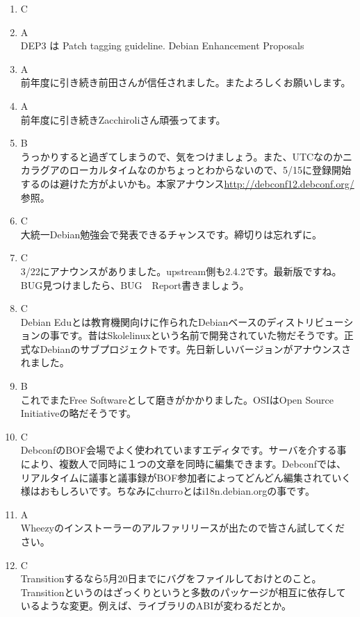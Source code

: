 \documentclass[mingoth,a4paper]{jsarticle}
\begin{document}
\begin{multicols}{2}
\begin{enumerate}
\item C\\
\item A\\ DEP3 は Patch tagging guideline. Debian Enhancement Proposals
\item A\\ 前年度に引き続き前田さんが信任されました。またよろしくお願いします。
\item A\\ 前年度に引き続きZacchiroliさん頑張ってます。
\item B\\ うっかりすると過ぎてしまうので、気をつけましょう。また、UTCなのかニカラグアのローカルタイムなのかちょっとわからないので、5/15に登録開始するのは避けた方がよいかも。本家アナウンス\url {http://debconf12.debconf.org/}参照。
\item  C\\ 大統一Debian勉強会で発表できるチャンスです。締切りは忘れずに。
\item  C\\ 3/22にアナウンスがありました。upstream側も2.4.2です。最新版ですね。BUG見つけましたら、BUG　Report書きましょう。
\item C\\ Debian Eduとは教育機関向けに作られたDebianベースのディストリビューションの事です。昔はSkolelinuxという名前で開発されていた物だそうです。正式なDebianのサブプロジェクトです。先日新しいバージョンがアナウンスされました。
\item B\\ これでまたFree Softwareとして磨きがかかりました。OSIはOpen Source Initiativeの略だそうです。
\item C\\ DebconfのBOF会場でよく使われていますエディタです。サーバを介する事により、複数人で同時に１つの文章を同時に編集できます。Debconfでは、リアルタイムに議事と議事録がBOF参加者によってどんどん編集されていく様はおもしろいです。ちなみにchurroとはi18n.debian.orgの事です。
\item A\\ Wheezyのインストーラーのアルファリリースが出たので皆さん試してください。
\item C\\ Transitionするなら5月20日までにバグをファイルしておけとのこと。Transitionというのはざっくりというと多数のパッケージが相互に依存しているような変更。例えば、ライブラリのABIが変わるだとか。
\end{enumerate}
\end{multicols}
\end{document}
